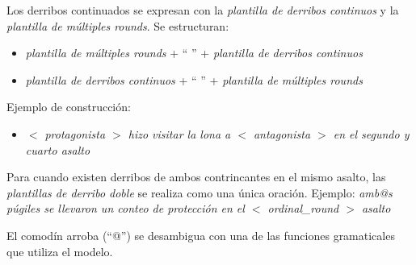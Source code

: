     Los derribos continuados se expresan con la \textit{plantilla de derribos continuos}  y la \textit{plantilla de múltiples rounds}.
    Se estructuran:
    \begin{itemize}
        \item \textit{plantilla de múltiples rounds} + “ ” + \textit{plantilla de derribos continuos}
        \item \textit{plantilla de derribos continuos} + “ ” + \textit{plantilla de múltiples rounds} 
    \end{itemize}
    Ejemplo de construcción:
    \begin{itemize}
        \item \textit{ $<$ protagonista $>$ hizo visitar la lona a $<$ antagonista $>$ en el segundo y cuarto asalto}
    \end{itemize}

    Para cuando existen derribos de ambos contrincantes en el mismo asalto, las \textit{plantillas de derribo doble} se realiza como 
una única oración.
    Ejemplo: \textit{amb@s púgiles se llevaron un conteo de protección en el $<$ ordinal\_round $>$ asalto}

    El comodín arroba (“@”) se desambigua con una de las funciones gramaticales que utiliza el modelo. 

